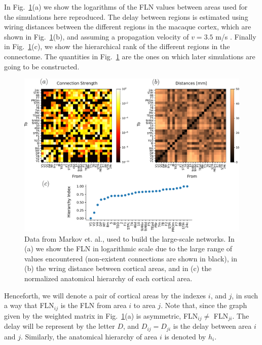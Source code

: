 In Fig.~\ref{fig:fig_data}(a) we show the logarithms of the FLN values between areas used for the simulations here reproduced. The delay between regions is estimated using wiring distances between the different regions in the macaque cortex, which are shown in Fig.~\ref{fig:fig_data}(b), and assuming a propagation velocity of $v=3.5$ m/s \cite{swadlow1990efferent}. Finally in  Fig.~\ref{fig:fig_data}(c), we show the hierarchical rank of the different regions in the connectome. The quantities in Fig.~\ref{fig:fig_data} are the ones on which later simulations are going to be constructed. 

\begin{figure}[!ht]
 \centering
 \includegraphics[scale=0.5]{figures/fig_markov.pdf}
 \caption{Data from Markov et. al., \cite{markov2014b} used to build the large-scale networks. In (a) we show the FLN in logarithmic scale due to the large range of values encountered (non-existent connections are shown in black), in (b) the wring distance between cortical areas, and in (c) the normalized anatomical hierarchy of each cortical area.}\label{fig:fig_data}
\end{figure}

Henceforth, we will denote a pair of cortical areas by the indexes $i$, and $j$, in such a way that FLN$_{ij}$ is the FLN from area $i$ to area $j$. Note that, since the graph given by the weighted matrix in Fig.~\ref{fig:fig_data}(a) is asymmetric, FLN$_{ij} \ne $ FLN$_{ji}$. The delay will be represent by the letter $D$, and $D_{ij} = D_{ji}$ is the delay between area $i$ and $j$. Similarly, the anatomical hierarchy of area $i$ is denoted by $h_{i}$.


